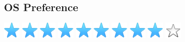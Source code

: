 \documentclass[]{cv-class}
\begin{document}
\begin{aside}
  \section{OS Preference}
    {\includegraphics[scale=0.30]{img/star.png}
    \includegraphics[scale=0.30]{img/star.png}
    \includegraphics[scale=0.30]{img/star.png}
    \includegraphics[scale=0.30]{img/star.png}
    \includegraphics[scale=0.30]{img/star.png}}
    {\includegraphics[scale=0.30]{img/star.png}
    \includegraphics[scale=0.30]{img/star.png}
    \includegraphics[scale=0.30]{img/star.png}
    \includegraphics[scale=0.30]{img/star.png}
    \includegraphics[scale=0.30]{img/star_empty.png}}
    ~
\end{aside}

\vspace{0.75cm}
\end{document}
